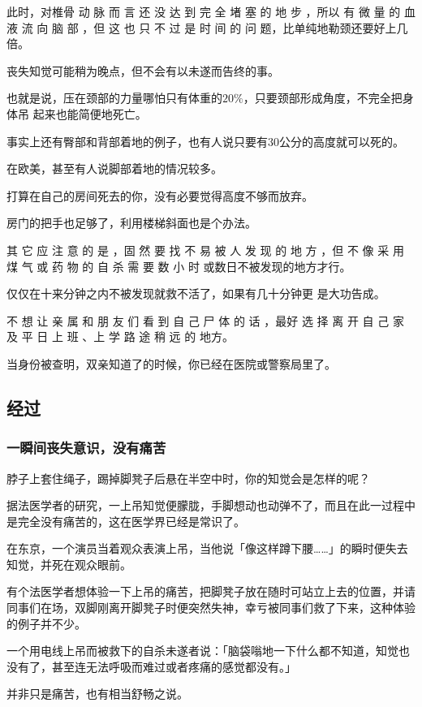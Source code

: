 \documentclass[UTF8]{ctexart}
\begin{document}
此时，对椎骨 动 脉 而 言 还 没 达 到 完 全 堵 塞 的 地 步 ，所以 有 微 量 的 血 液 流 向 脑 部 ，但 这 也 只 不 过 是 时 间 的 问 题，比单纯地勒颈还要好上几倍。

丧失知觉可能稍为晚点，但不会有以未遂而告终的事。

也就是说，压在颈部的力量哪怕只有体重的$20\%$，只要颈部形成角度，不完全把身体吊 起来也能简便地死亡。

事实上还有臀部和背部着地的例子，也有人说只要有$30$公分的高度就可以死的。

在欧美，甚至有人说脚部着地的情况较多。

打算在自己的房间死去的你，没有必要觉得高度不够而放弃。

房门的把手也足够了，利用楼梯斜面也是个办法。

其 它 应 注 意 的 是 ，固 然 要 找 不 易 被 人 发 现 的 地 方 ，但 不 像 采 用 煤 气 或 药 物 的 自 杀 需 要 数 小 时 或数日不被发现的地方才行。

仅仅在十来分钟之内不被发现就救不活了，如果有几十分钟更 是大功告成。

不 想 让 亲 属 和 朋 友 们 看 到 自 己 尸 体 的 话 ，最好 选 择 离 开 自 己 家 及 平 日 上 班 、上 学 路 途 稍 远 的 地方。

当身份被查明，双亲知道了的时候，你已经在医院或警察局里了。

\subsection{经过}

\subsubsection*{一瞬间丧失意识，没有痛苦}

脖子上套住绳子，踢掉脚凳子后悬在半空中时，你的知觉会是怎样的呢？

据法医学者的研究，一上吊知觉便朦胧，手脚想动也动弹不了，而且在此一过程中是完全没有痛苦的，这在医学界已经是常识了。

在东京，一个演员当着观众表演上吊，当他说「像这样蹲下腰……」的瞬时便失去知觉，并死在观众眼前。

有个法医学者想体验一下上吊的痛苦，把脚凳子放在随时可站立上去的位置，并请同事们在场，双脚刚离开脚凳子时便突然失神，幸亏被同事们救了下来，这种体验的例子并不少。

一个用电线上吊而被救下的自杀未遂者说：「脑袋嗡地一下什么都不知道，知觉也没有了，甚至连无法呼吸而难过或者疼痛的感觉都没有。」

并非只是痛苦，也有相当舒畅之说。
\end{document}
